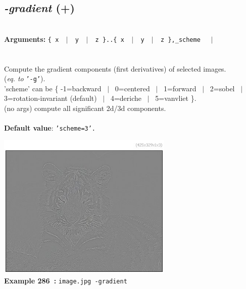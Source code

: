 \documentclass[a4paper,11pt,twoside]{book}
\begin{document}
\subsection{\emph{-gradient} (+)}\vspace*{-0.5em}
~\\\textbf{Arguments: } 
{\small \texttt{\{ x ~$|$~ y ~$|$~ z \}..\{ x ~$|$~ y ~$|$~ z \},\_scheme}}~~~$|$\\
\\~\\
Compute the gradient components (first derivatives) of selected images.
~\\(\emph{eq. to} {\small \texttt{'-g'}}).
~\\'scheme' can be \{ -1=backward ~$|$~ 0=centered ~$|$~ 1=forward ~$|$~ 2=sobel ~$|$~ 3=rotation-invariant (default) ~$|$~ 4=deriche ~$|$~ 5=vanvliet \}.
~\\(no args) compute all significant 2d/3d components.
~\\~\\\textbf{Default value}: {\small \texttt{'scheme=3'.}}
\begin{center}\includegraphics[keepaspectratio=true,height=7cm,width=\textwidth]{img/gmic_def286.jpg}\\
{\footnotesize \textbf{Example 286~:} \texttt{image.jpg -gradient}}
\end{center}
\end{document}
